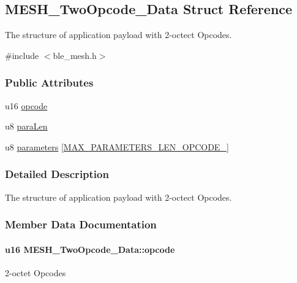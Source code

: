 \hypertarget{struct_m_e_s_h___two_opcode___data}{}\subsection{M\+E\+S\+H\+\_\+\+Two\+Opcode\+\_\+\+Data Struct Reference}
\label{struct_m_e_s_h___two_opcode___data}


The structure of application payload with 2-\/octect Opcodes.  




{\ttfamily \#include $<$ble\+\_\+mesh.\+h$>$}

\subsubsection*{Public Attributes}
\begin{DoxyCompactItemize}
\item 
u16 \hyperlink{struct_m_e_s_h___two_opcode___data_a4685d8cfa8b29ad5a3e9aab778edb7c8}{opcode}
\item 
u8 \hyperlink{struct_m_e_s_h___two_opcode___data_ad040cbe20d3fd3cfbfe0ea5385a2e8e7}{para\+Len}
\item 
u8 \hyperlink{struct_m_e_s_h___two_opcode___data_a818cca5aff319e42c3ab88812d5c6dd1}{parameters} \mbox{[}\hyperlink{group___m_e_s_h___p_a_r_a_m_s___l_e_n___d_e_f_gacc9570316101fc0c9a33fcbf73d73632}{M\+A\+X\+\_\+\+P\+A\+R\+A\+M\+E\+T\+E\+R\+S\+\_\+\+L\+E\+N\+\_\+\+O\+P\+C\+O\+D\+E\+\_}\mbox{]}
\end{DoxyCompactItemize}


\subsubsection{Detailed Description}
The structure of application payload with 2-\/octect Opcodes. 

\subsubsection{Member Data Documentation}
\paragraph[{\texorpdfstring{opcode}{opcode}}]{\setlength{\rightskip}{0pt plus 5cm}u16 M\+E\+S\+H\+\_\+\+Two\+Opcode\+\_\+\+Data\+::opcode}\hypertarget{struct_m_e_s_h___two_opcode___data_a4685d8cfa8b29ad5a3e9aab778edb7c8}{}\label{struct_m_e_s_h___two_opcode___data_a4685d8cfa8b29ad5a3e9aab778edb7c8}
2-\/octet Opcodes 
